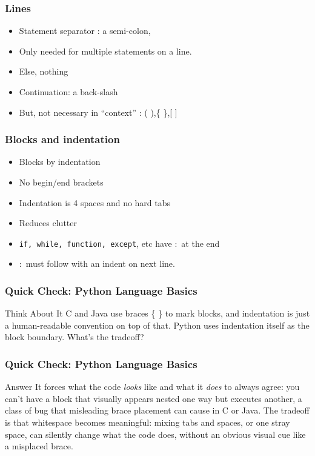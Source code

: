 \begin{frame}[fragile] \frametitle{Lines}
\begin{itemize}
\item  Statement separator : a semi-colon,
\item Only needed for multiple statements on a line.
\item Else, nothing
\item Continuation: a back-slash
\item  But, not necessary in ``context'' : ( ),\{ \},[ ]
\end{itemize}
\end{frame}

\begin{frame}[fragile] \frametitle{Blocks and indentation}
\begin{itemize}
\item  Blocks by indentation
\item No begin/end brackets
\item Indentation is 4 spaces and no hard tabs
\item Reduces clutter
\item \lstinline{if, while, function, except}, etc have $:$ at the end
\item $:$ must follow with an indent on next line.
\end{itemize}
\end{frame}

\begin{frame}[fragile]\frametitle{Quick Check: Python Language Basics}
\begin{block}{Think About It}
C and Java use braces \{ \} to mark blocks, and indentation is just a human-readable convention on top of that. Python uses indentation itself as the block boundary. What's the tradeoff?
\end{block}
\end{frame}

\begin{frame}[fragile]\frametitle{Quick Check: Python Language Basics}
\begin{block}{Answer}
It forces what the code \emph{looks} like and what it \emph{does} to always agree: you can't have a block that visually appears nested one way but executes another, a class of bug that misleading brace placement can cause in C or Java. The tradeoff is that whitespace becomes meaningful: mixing tabs and spaces, or one stray space, can silently change what the code does, without an obvious visual cue like a misplaced brace.
\end{block}
\end{frame}

